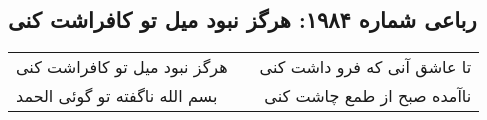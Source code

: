 \begin{center}
\section*{رباعی شماره ۱۹۸۴: هرگز نبود میل تو کافراشت کنی}
\label{sec:1984}
\begin{longtable}{l p{0.5cm} r}
هرگز نبود میل تو کافراشت کنی
&&
تا عاشق آنی که فرو داشت کنی
\\
بسم الله ناگفته تو گوئی الحمد
&&
ناآمده صبح از طمع چاشت کنی
\\
\end{longtable}
\end{center}
